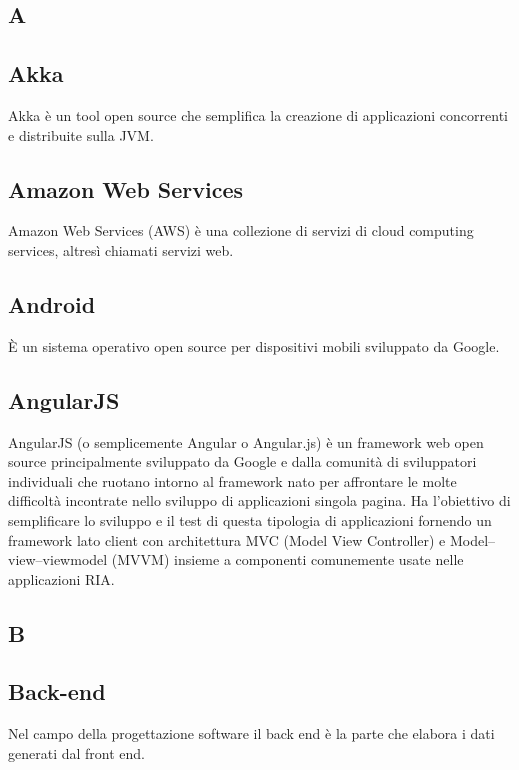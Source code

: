 \newpage

\begin{center}
\Huge\section{\uppercase{A}}
\end{center}

\subsection{Akka}
Akka è un tool open source che semplifica la creazione di applicazioni concorrenti e distribuite sulla JVM.

\subsection{Amazon Web Services}
Amazon Web Services (AWS) è una collezione di servizi di cloud computing services, altresì chiamati servizi web.

\subsection{Android}
È un sistema operativo open source per dispositivi mobili sviluppato da Google.

\subsection{AngularJS}
AngularJS (o semplicemente Angular o Angular.js) è un framework web open source principalmente sviluppato da Google e dalla comunità di sviluppatori individuali che ruotano intorno al framework nato per affrontare le molte difficoltà incontrate nello sviluppo di applicazioni singola pagina. Ha l'obiettivo di semplificare lo sviluppo e il test di questa tipologia di applicazioni fornendo un framework lato client con architettura MVC (Model View Controller) e Model–view–viewmodel (MVVM) insieme a componenti comunemente usate nelle applicazioni RIA.

\newpage

\begin{center}
\Huge\section{\uppercase{B}}
\end{center}

\subsection{Back-end}
Nel campo della progettazione software il back end è la parte che elabora i dati generati dal front end.

